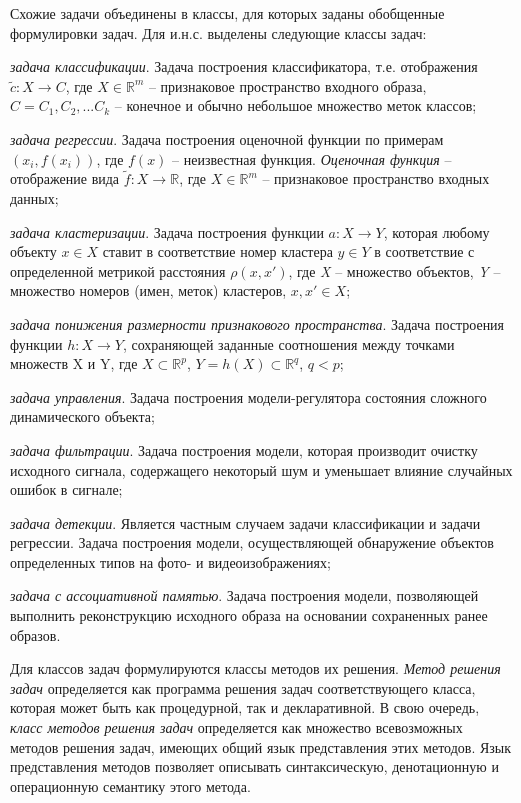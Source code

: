 Схожие задачи объединены в классы, для которых заданы обобщенные формулировки задач. Для и.н.с. выделены следующие классы задач:
\begin{textitemize}
	\item \textit{задача классификации}. Задача построения классификатора, т.е. отображения $\tilde c: X \rightarrow C$, где $ X \in \mathbb{R}^m$ -- признаковое пространство входного образа, $C = {C_1, C_2, ...C_k }$ -- конечное и обычно небольшое множество меток классов;
	\item \textit{задача регрессии}. Задача построения оценочной функции по примерам $(x_i, f(x_i))$, где $f(x)$ -- неизвестная функция. \textit{Оценочная функция} -- отображение вида $\tilde{f}: X \rightarrow \mathbb{R}$, где $X \in \mathbb{R}^m$ -- признаковое пространство входных данных;
	\item \textit{задача кластеризации}. Задача построения функции $a: X \rightarrow Y$, которая любому объекту $x \in X$ ставит в соответствие номер кластера $y \in Y$ в соответствие с определенной метрикой расстояния $\rho(x, x')$, где \textit{X} -- множество объектов, \textit{Y} -- множество номеров (имен, меток) кластеров, $x, x' \in X$;
	\item \textit{задача понижения размерности признакового пространства}. Задача построения функции $h: X \rightarrow Y$, сохраняющей заданные соотношения между точками множеств X и Y, где $X \subset \mathbb{R}^p$, $Y=h(X) \subset \mathbb{R}^q$, $q < p$;
	\item \textit{задача управления}. Задача построения модели-регулятора состояния сложного динамического объекта;
	\item \textit{задача фильтрации}. Задача построения модели, которая производит очистку исходного сигнала, содержащего некоторый шум и уменьшает влияние случайных ошибок в сигнале;
	\item \textit{задача детекции}. Является частным случаем задачи классификации и задачи регрессии. Задача построения модели, осуществляющей обнаружение объектов определенных типов на фото- и видеоизображениях;
	\item \textit{задача с ассоциативной памятью}. Задача построения модели, позволяющей выполнить реконструкцию исходного образа на основании сохраненных ранее образов.
\end{textitemize}

Для классов задач формулируются классы методов их решения. \textit{Метод решения задач} определяется как программа решения задач соответствующего класса, которая может быть как процедурной, так и декларативной. В свою очередь, \textit{класс методов решения задач} определяется как множество всевозможных методов решения задач, имеющих общий язык представления этих методов. Язык представления методов позволяет описывать синтаксическую, денотационную и операционную семантику этого метода.

